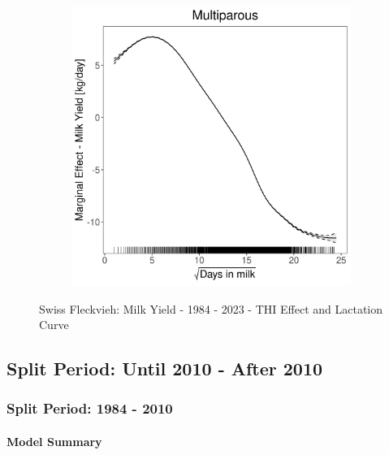 \begin{figure}[H]
\begin{subfigure}[b]{0.45\textwidth}
    \end{subfigure}
    \hspace{0.05\textwidth} %
    \begin{subfigure}[b]{0.45\textwidth}
        \centering
        \includegraphics[width=\textwidth]{thesis/figures/models/milk/full/sf_milk_full/sf_milk_full_marginal_dim_milk_multi.png}
    \end{subfigure}
    \caption[]{Swiss Fleckvieh: Milk Yield - 1984 - 2023 - THI Effect and Lactation Curve}
    \label{fig:main}
\end{figure}

\subsection{Split Period: Until 2010 - After 2010}
\subsubsection{Split Period: 1984 - 2010}\label{model:sf_milk_before}
\paragraph{Model Summary} \quad \\

